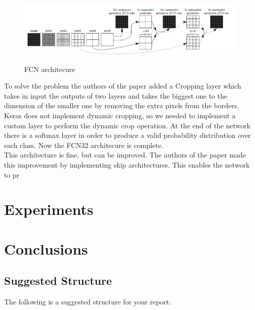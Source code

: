 \documentclass[10pt,twocolumn,letterpaper]{article}
\begin{document}
\begin{figure}
	\includegraphics[width=\textwidth]{image/fcn}
	\label{fcn}
	\centering
	\caption{FCN architecure}
\end{figure}
To solve the problem the authors of the paper added a Cropping layer which takes in input the outputs of two layers and takes the biggest one to the dimension of the smaller one by removing the extra pixels from the borders. Keras does not implement dynamic cropping, so we needed to implement a custom layer to perform the dynamic crop operation. At the end of the network there is a softmax layer in order to produce a valid probability distribution over each class.
Now the FCN32 architecure is complete. \\
This architecture is fine, but can be improved. The authors of the paper made this improvement by implementing skip architectures. This enables the network to pr



\section{Experiments}

\section{Conclusions}

\subsection{Suggested Structure}

The following is a suggested structure for your report:
\end{document}
